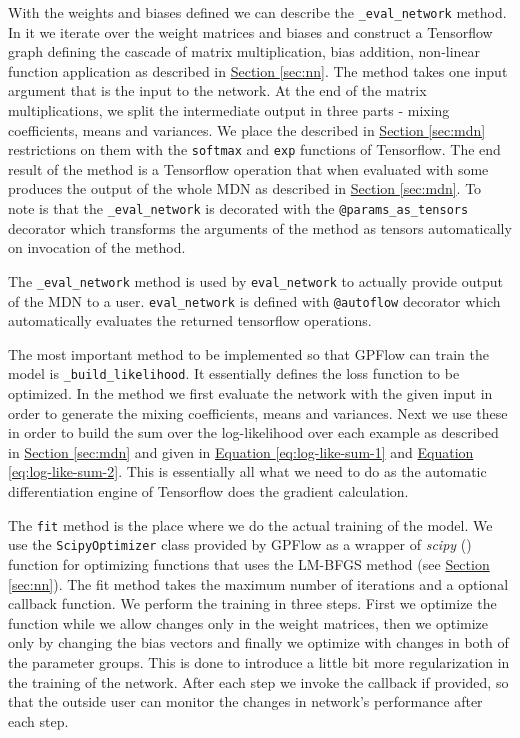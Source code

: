 \documentclass[12pt,a4paper,twoside]{scrartcl}
\numberwithin{equation}{section}
\newcommand{\refsec}[1]{\hyperref[#1]{Section \ref*{#1}}}
\renewcommand*{\refeq}[1]{\hyperref[#1]{Equation \ref*{#1}}}
\begin{document}
With the weights and biases defined we can describe the \texttt{\_eval\_network} method. In it we iterate over the weight matrices and biases and construct a Tensorflow graph defining the cascade of matrix multiplication, bias addition, non-linear function application as described in \refsec{sec:nn}. The method takes one input argument that is the input to the network. At the end of the matrix multiplications, we split the intermediate output in three parts - mixing coefficients, means and variances. We place the described in \refsec{sec:mdn} restrictions on them with the \texttt{softmax} and \texttt{exp} functions of Tensorflow. The end result of the method is a Tensorflow operation that when evaluated with some produces the output of the whole MDN as described in \refsec{sec:mdn}. To note is that the \texttt{\_eval\_network} is decorated with the \texttt{@params\_as\_tensors} decorator which transforms the arguments of the method as tensors automatically on invocation of the method.

The \texttt{\_eval\_network} method is used by \texttt{eval\_network} to actually provide output of the MDN to a user. \texttt{eval\_network} is defined with \texttt{@autoflow} decorator which automatically evaluates the returned tensorflow operations.

The most important method to be implemented so that GPFlow can train the model is \texttt{\_build\_likelihood}. It essentially defines the loss function to be optimized. In the method we first evaluate the network with the given input in order to generate the mixing coefficients, means and variances. Next we use these in order to build the sum over the log-likelihood over each example as described in \refsec{sec:mdn} and given in \refeq{eq:log-like-sum-1} and \refeq{eq:log-like-sum-2}. This is essentially all what we need to do as the automatic differentiation engine of Tensorflow does the gradient calculation. 

The \texttt{fit} method is the place where we do the actual training of the model. We use the \texttt{ScipyOptimizer} class provided by GPFlow as a wrapper of \emph{scipy} (\cite{scipy}) function for optimizing functions that uses the LM-BFGS method (see \refsec{sec:nn}). The fit method takes the maximum number of iterations and a optional callback function. We perform the training in three steps. First we optimize the function while we allow changes only in the weight matrices, then we optimize only by changing the bias vectors and finally we optimize with changes in both of the parameter groups. This is done to introduce a little bit more regularization in the training of the network. After each step we invoke the callback if provided, so that the outside user can monitor the changes in network's performance after each step.
\end{document}
